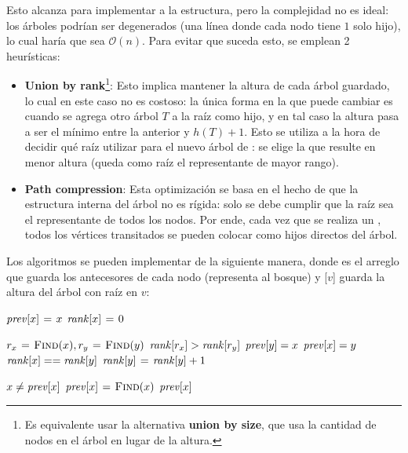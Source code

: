 \documentclass[a4paper]{report}
\newcommand{\BigO}[1]{\ensuremath{\mathcal{O}(#1)}}
\begin{document}
Esto alcanza para implementar a la estructura, pero la complejidad no es ideal: los árboles podrían ser degenerados (una línea donde cada nodo tiene $1$ solo hijo), lo cual haría que  sea \BigO{n}. Para evitar que suceda esto, se emplean 2 heurísticas:
\begin{itemize}
    \item \textbf{Union by rank}\footnote{Es equivalente usar la alternativa \textbf{union by size}, que usa la cantidad de nodos en el árbol en lugar de la altura.}: Esto implica mantener la altura de cada árbol guardado, lo cual en este caso no es costoso: la única forma en la que puede cambiar es cuando se agrega otro árbol $T$ a la raíz como hijo, y en tal caso la altura pasa a ser el mínimo entre la anterior y $h(T) + 1$. Esto se utiliza a la hora de decidir qué raíz utilizar para el nuevo árbol de : se elige la que resulte en menor altura (queda como raíz el representante de mayor rango).
    \item \textbf{Path compression}: Esta optimización se basa en el hecho de que la estructura interna del árbol no es rígida: solo se debe cumplir que la raíz sea el representante de todos los nodos. Por ende, cada vez que se realiza un , todos los vértices transitados se pueden colocar como hijos directos del árbol.
\end{itemize}

Los algoritmos se pueden implementar de la siguiente manera, donde  es el arreglo que guarda los antecesores de cada nodo (representa al bosque) y [$v$] guarda la altura del árbol con raíz en $v$:
\begin{codebox}
    \li $\id{prev}[x] \gets x$
    \li $\id{rank}[x] \gets 0$
\end{codebox}
\begin{codebox}
    \li $r_x \mathrel{\hspace{1pt}=\hspace{1pt}} \textnormal{\scshape Find}(x), r_y \mathrel{\hspace{1pt}=\hspace{1pt}} \textnormal{\scshape Find}(y)$
    \li \If $\id{rank}[r_x] > \id{rank}[r_y]$ \Then
    \li $\id{prev}[y] = x$
    \li \Else
    \li $\id{prev}[x] = y$
    \li \If $\id{rank}[x] == \id{rank}[y]$ \Then
    \li $\id{rank}[y] \gets \id{rank}[y] + 1$
    \End
    \End
\end{codebox}
\begin{codebox}
    \li \If $x \neq \id{prev}[x]$ \Then
    \li $\id{prev}[x] \gets \proc{Find}(x)$
    \End
    \li \Return $\id{prev}[x]$
\end{codebox}
\end{document}
